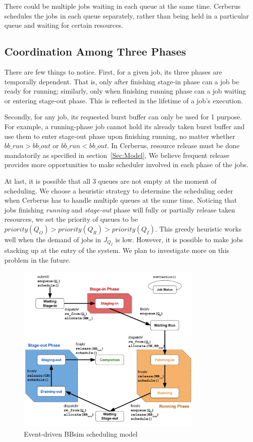 There could be multiple jobs waiting in each queue at the same time. 
Cerberus schedules the jobs in each queue separately, 
rather than being held in a particular queue and waiting for certain resources.

\subsection{Coordination Among Three Phases}
There are few things to notice.
First, for a given job, its three phases are temporally dependent.
That is, only after finishing stage-in phase can a job be ready for running;
similarly, only when finishing running phase can a job waiting or entering stage-out phase.
This is reflected in the lifetime of a job's execution.

Secondly, for any job,
its requested burst buffer can only be used for 1 purpose.
For example, a running-phase job cannot hold its already taken burst buffer
and use them to enter stage-out phase upon finishing running,
no matter whether $bb\_run > bb\_out$ or $bb\_run < bb\_out$.
In Cerberus, resource release must be done mandatorily as specified in section~\ref{Sec:Model},
We believe frequent release provides more opportunities to make scheduler involved in each phase of the jobs.

At last, it is possible that all 3 queues are not empty at the moment of scheduling.
We choose a heuristic strategy to determine the scheduling order when
Cerberus has to handle multiple queues at the same time.
Noticing that jobs finishing \textit{running} and \textit{stage-out} phase
will fully or partially release taken resources,
we set the priority of queues to be $priority(Q_O) > priority(Q_R) > priority(Q_I)$.
This greedy heuristic works well when the demand of jobs in $J_{Q_I}$ is low.
However, it is possible to make jobs stacking up at the entry of the system.
We plan to investigate more on this problem in the future.

\begin{figure}[!htbp]
\centering
        \includegraphics[width=3.6in]{3PhaseJobFSM}
        \caption{Event-driven BBsim scheduling model}
\label{Fig:JobFSM}
\end{figure}

